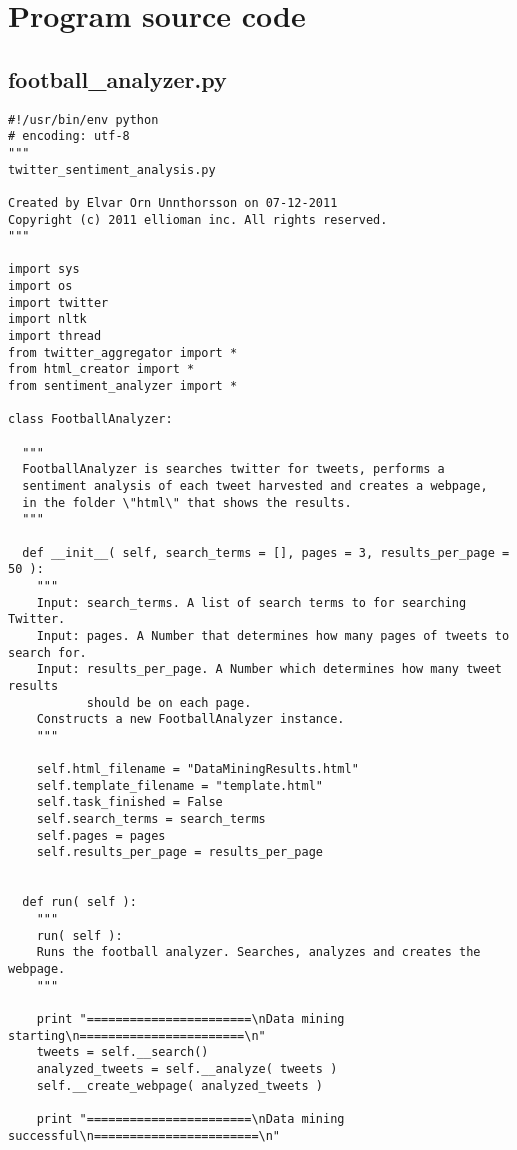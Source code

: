 \chapter{ Program source code }
\label{chap:appendix2}

\section{football\_analyzer.py} \label{sec:FootballAnalyzer}
\begin{verbatim}
#!/usr/bin/env python
# encoding: utf-8
"""
twitter_sentiment_analysis.py

Created by Elvar Orn Unnthorsson on 07-12-2011
Copyright (c) 2011 ellioman inc. All rights reserved.
"""

import sys
import os
import twitter
import nltk
import thread
from twitter_aggregator import *
from html_creator import *
from sentiment_analyzer import *

class FootballAnalyzer:

  """
  FootballAnalyzer is searches twitter for tweets, performs a 
  sentiment analysis of each tweet harvested and creates a webpage,
  in the folder \"html\" that shows the results.
  """
  
  def __init__( self, search_terms = [], pages = 3, results_per_page = 50 ):
    """
    Input: search_terms. A list of search terms to for searching Twitter.
    Input: pages. A Number that determines how many pages of tweets to search for.
    Input: results_per_page. A Number which determines how many tweet results 
           should be on each page.
    Constructs a new FootballAnalyzer instance.
    """
    
    self.html_filename = "DataMiningResults.html"
    self.template_filename = "template.html"
    self.task_finished = False
    self.search_terms = search_terms
    self.pages = pages
    self.results_per_page = results_per_page
  
  
  def run( self ):
    """
    run( self ):
    Runs the football analyzer. Searches, analyzes and creates the webpage.
    """
    
    print "=======================\nData mining starting\n=======================\n"
    tweets = self.__search()
    analyzed_tweets = self.__analyze( tweets )
    self.__create_webpage( analyzed_tweets )
    
    print "=======================\nData mining successful\n=======================\n"
  

\end{verbatim}

